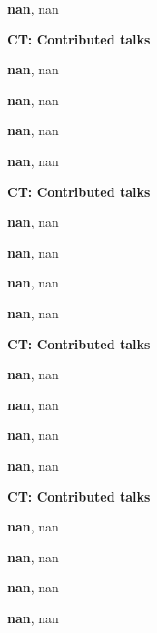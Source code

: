 \documentclass[ILAS2025-program.tex]{subfiles}
\begin{document}
\begin{description}
\begin{description}
        \item[] \textbf{nan}, nan
        \end{description}
    \begin{description}
    \item[] {\color{mstitle}\textbf{CT: Contributed talks}} 
    \item[] \textbf{nan}, nan
        \item[] \textbf{nan}, nan
        \item[] \textbf{nan}, nan
        \item[] \textbf{nan}, nan
        \end{description}
    \begin{description}
    \item[] {\color{mstitle}\textbf{CT: Contributed talks}} 
    \item[] \textbf{nan}, nan
        \item[] \textbf{nan}, nan
        \item[] \textbf{nan}, nan
        \item[] \textbf{nan}, nan
        \end{description}
    \begin{description}
    \item[] {\color{mstitle}\textbf{CT: Contributed talks}} 
    \item[] \textbf{nan}, nan
        \item[] \textbf{nan}, nan
        \item[] \textbf{nan}, nan
        \item[] \textbf{nan}, nan
        \end{description}
    \begin{description}
    \item[] {\color{mstitle}\textbf{CT: Contributed talks}} 
    \item[] \textbf{nan}, nan
        \item[] \textbf{nan}, nan
        \item[] \textbf{nan}, nan
        \item[] \textbf{nan}, nan

\end{description}
\end{description}
\end{document}
